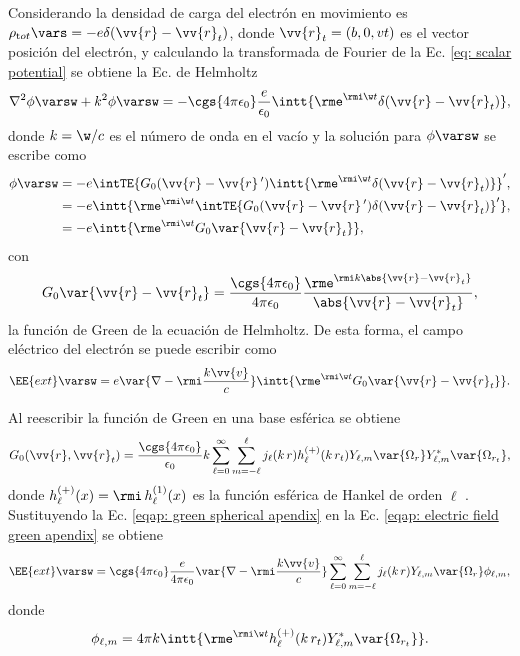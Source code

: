 Considerando la densidad de carga del electrón en movimiento es $\rho_{\text tot}\vars = -e \delta(\vv{r}-\vv{r}_t)$, donde $\vv{r}_t = (b,0,vt)$ es el vector posición del electrón, y calculando la transformada de Fourier de la Ec. \eqref{eq: scalar potential} se obtiene la Ec. de Helmholtz
\begin{equation}
\nabla^2\phi\varsw + k^2\phi\varsw = -\cgs{4\pi\epsilon_0}\frac{e}{\epsilon_0}\intt{\rme^{\rmi \w t} \delta(\vv{r}-\vv{r}_t)},
\end{equation}
donde $k = \w/c$ es el número de onda en el vacío y la solución para $\phi\varsw$ se escribe como \cite{maciel2019electromagnetic, de1999relativistic, barton1989elements} 
\begin{align}
\phi\varsw &= -e\intTE{G_0(\vv{r}-\vv{r}\,^{\prime})\intt{\rme^{\rmi \w t}\delta(\vv{r}-\vv{r}_t)}}^{\prime},\\
		   &= -e\intt{\rme^{\rmi \w t} \intTE{ G_0(\vv{r}-\vv{r}\,^{\prime}) \delta(\vv{r}-\vv{r}_t)}^{\prime}},\\
		   &= -e\intt{\rme^{\rmi \w t}G_0\var{\vv{r}-\vv{r}_t}},
\end{align}
con 
\begin{equation}
G_0\var{\vv{r}-\vv{r}_t} = \frac{\cgs{4\pi\epsilon_0}}{4\pi\epsilon_0}\frac{\rme^{\rmi k \abs{\vv{r}-\vv{r}_t}}}{\abs{\vv{r}-\vv{r}_t}},
\end{equation}
la función de Green de la ecuación de Helmholtz. De esta forma, el campo eléctrico del electrón se puede escribir como
\begin{equation}
\EE{ext}\varsw = e\var{\nabla-\rmi \frac{k\vv{v}}{c}} \intt{\rme^{\rmi \w t} G_0 \var{\vv{r}-\vv{r}_t}}. 
\label{eqap: electric field green apendix}
\end{equation}

Al reescribir la función de Green en una base esférica se obtiene 
\begin{equation}
G_0(\vv{r},\vv{r}_t)=\frac{\cgs{4\pi\epsilon_0}}{\epsilon_0} k \sum_{\ell=0}^{\infty}\sum_{m=-\ell}^{\ell} j_{\ell}(k \, r) h_{\ell}^{(+)}(k \, r_t) Y_{\ell,m}\var{\Omega_r} Y_{\ell, m}^{*}\var{\Omega_{r_t}}, \label{eqap: green spherical apendix}
\end{equation}
donde $h_{\ell}^{(+)}(x)= \rmi \, h_{\ell}^{(1)}(x)$ es la función esférica de Hankel de orden $\ell$ \cite{Abramowitz}. Sustituyendo la Ec. \eqref{eqap: green spherical apendix} en la Ec. \eqref{eqap: electric field green apendix} se obtiene
\begin{equation}
\EE{ext}\varsw = \cgs{4\pi\epsilon_0}\frac{e}{4\pi\epsilon_0}\var{\nabla-\rmi \frac{k\vv{v}}{c}} \sum_{\ell=0}^{\infty}\sum_{m=-\ell}^{\ell} j_{\ell}(k \, r) Y_{\ell,m}\var{\Omega_r} \phi_{\ell, m},
\label{eqap: ext electric field spherical}
\end{equation}
donde 
\begin{equation}
\phi_{\ell, m} = 4\pi k \intt{\rme^{\rmi \w t} h_{\ell}^{(+)}(k \, r_t) Y_{\ell, m}^{*}\var{\Omega_{r_t}}}.
\label{eqap: phi lm apendix}
\end{equation}


